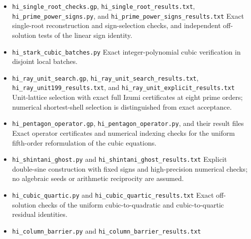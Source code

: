 \documentclass[11pt,reqno]{amsart}
\theoremstyle{plain}
\begin{document}
\begin{itemize}
\texttt{hi\_\allowbreak stark\_\allowbreak single\_\allowbreak root.gp}, \texttt{hi\_\allowbreak stark25\_\allowbreak construction\_\allowbreak results.txt}, and
\texttt{hi\_\allowbreak stark25\_\allowbreak verification\_\allowbreak results.txt}
Prime-power one-root construction, the exact conjugate-prime twist at
order 25, and its complete independent verification.
\item \texttt{hi\_\allowbreak single\_\allowbreak root\_\allowbreak checks.gp}, \texttt{hi\_\allowbreak single\_\allowbreak root\_\allowbreak results.txt},
\texttt{hi\_\allowbreak prime\_\allowbreak power\_\allowbreak signs.py}, and \texttt{hi\_\allowbreak prime\_\allowbreak power\_\allowbreak signs\_\allowbreak results.txt}
Exact single-root reconstruction and sign-selection checks, and
independent off-solution tests of the linear sign identity.
\item \texttt{hi\_\allowbreak stark\_\allowbreak cubic\_\allowbreak batches.py}
Exact integer-polynomial cubic verification in disjoint local batches.
\item \texttt{hi\_\allowbreak ray\_\allowbreak unit\_\allowbreak search.gp}, \texttt{hi\_\allowbreak ray\_\allowbreak unit\_\allowbreak search\_\allowbreak results.txt},
\texttt{hi\_\allowbreak ray\_\allowbreak unit199\_\allowbreak results.txt}, and \texttt{hi\_\allowbreak ray\_\allowbreak unit\_\allowbreak explicit\_\allowbreak results.txt}
Unit-lattice selection with exact full Izumi certificates at eight prime orders; numerical shortest-shell selection is distinguished from exact acceptance.
\item \texttt{hi\_\allowbreak pentagon\_\allowbreak operator.gp}, \texttt{hi\_\allowbreak pentagon\_\allowbreak operator.py}, and their result files
Exact operator certificates and numerical indexing checks for the uniform fifth-order reformulation of the cubic equations.
\item \texttt{hi\_\allowbreak shintani\_\allowbreak ghost.py} and \texttt{hi\_\allowbreak shintani\_\allowbreak ghost\_\allowbreak results.txt}
Explicit double-sine construction with fixed signs and high-precision numerical checks; no algebraic seeds or arithmetic reciprocity are assumed.
\item \texttt{hi\_\allowbreak cubic\_\allowbreak quartic.py} and \texttt{hi\_\allowbreak cubic\_\allowbreak quartic\_\allowbreak results.txt}
Exact off-solution checks of the uniform cubic-to-quadratic and cubic-to-quartic residual identities.
\item \texttt{hi\_\allowbreak column\_\allowbreak barrier.py} and \texttt{hi\_\allowbreak column\_\allowbreak barrier\_\allowbreak results.txt}

\end{itemize}
\end{document}
